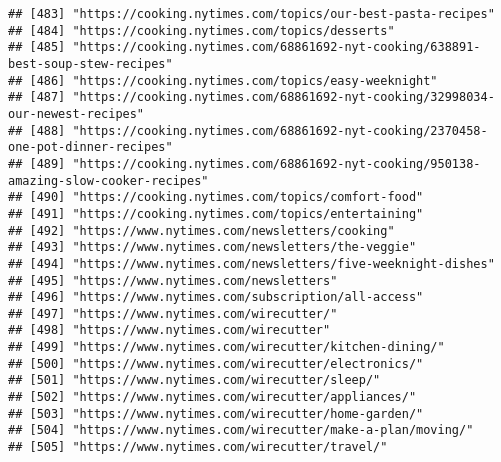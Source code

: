 \documentclass[
]{article}
\begin{document}
\begin{verbatim}
## [483] "https://cooking.nytimes.com/topics/our-best-pasta-recipes"                                                 
## [484] "https://cooking.nytimes.com/topics/desserts"                                                               
## [485] "https://cooking.nytimes.com/68861692-nyt-cooking/638891-best-soup-stew-recipes"                            
## [486] "https://cooking.nytimes.com/topics/easy-weeknight"                                                         
## [487] "https://cooking.nytimes.com/68861692-nyt-cooking/32998034-our-newest-recipes"                              
## [488] "https://cooking.nytimes.com/68861692-nyt-cooking/2370458-one-pot-dinner-recipes"                           
## [489] "https://cooking.nytimes.com/68861692-nyt-cooking/950138-amazing-slow-cooker-recipes"                       
## [490] "https://cooking.nytimes.com/topics/comfort-food"                                                           
## [491] "https://cooking.nytimes.com/topics/entertaining"                                                           
## [492] "https://www.nytimes.com/newsletters/cooking"                                                               
## [493] "https://www.nytimes.com/newsletters/the-veggie"                                                            
## [494] "https://www.nytimes.com/newsletters/five-weeknight-dishes"                                                 
## [495] "https://www.nytimes.com/newsletters"                                                                       
## [496] "https://www.nytimes.com/subscription/all-access"                                                           
## [497] "https://www.nytimes.com/wirecutter/"                                                                       
## [498] "https://www.nytimes.com/wirecutter"                                                                        
## [499] "https://www.nytimes.com/wirecutter/kitchen-dining/"                                                        
## [500] "https://www.nytimes.com/wirecutter/electronics/"                                                           
## [501] "https://www.nytimes.com/wirecutter/sleep/"                                                                 
## [502] "https://www.nytimes.com/wirecutter/appliances/"                                                            
## [503] "https://www.nytimes.com/wirecutter/home-garden/"                                                           
## [504] "https://www.nytimes.com/wirecutter/make-a-plan/moving/"                                                    
## [505] "https://www.nytimes.com/wirecutter/travel/"                                                                

\end{verbatim}
\end{document}
